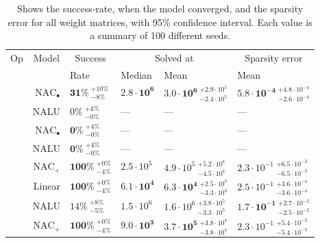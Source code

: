 \begin{table}[!h]

\caption{\label{tab:function-task-static-defaults}Shows the success-rate, when the model converged, and the sparsity error for all weight matrices, with 95\% confidence interval. Each value is a summary of 100 different seeds.}
\centering
\begin{tabular}{crllll}
\toprule
\multicolumn{1}{c}{Op} & \multicolumn{1}{c}{Model} & \multicolumn{1}{c}{Success} & \multicolumn{2}{c}{Solved at} & \multicolumn{1}{c}{Sparsity error} \\
\cmidrule(l{3pt}r{3pt}){1-1} \cmidrule(l{3pt}r{3pt}){2-2} \cmidrule(l{3pt}r{3pt}){3-3} \cmidrule(l{3pt}r{3pt}){4-5} \cmidrule(l{3pt}r{3pt}){6-6}
 &  & Rate & Median & Mean & Mean\\
\midrule
 & $\mathrm{NAC}_{\bullet}$ & $\mathbf{31\%} {~}^{+10\%}_{-8\%}$ & $\mathbf{2.8 \cdot 10^{6}}$ & $\mathbf{3.0 \cdot 10^{6}} {~}^{+2.9 \cdot 10^{5}}_{-2.4 \cdot 10^{5}}$ & $\mathbf{5.8 \cdot 10^{-4}} {~}^{+4.8 \cdot 10^{-4}}_{-2.6 \cdot 10^{-4}}$\\

\nopagebreak
\multirow{-2}{*}{\centering\arraybackslash $\bm{\times}$} & NALU & $0\% {~}^{+4\%}_{-0\%}$ & --- & --- & ---\\
\cmidrule{1-6}
 & $\mathrm{NAC}_{\bullet}$ & $\mathbf{0\%} {~}^{+4\%}_{-0\%}$ & --- & --- & ---\\

\nopagebreak
\multirow{-2}{*}{\centering\arraybackslash $\bm{\mathbin{/}}$} & NALU & $\mathbf{0\%} {~}^{+4\%}_{-0\%}$ & --- & --- & ---\\
\cmidrule{1-6}
 & $\mathrm{NAC}_{+}$ & $\mathbf{100\%} {~}^{+0\%}_{-4\%}$ & $2.5 \cdot 10^{5}$ & $4.9 \cdot 10^{5} {~}^{+5.2 \cdot 10^{4}}_{-4.5 \cdot 10^{4}}$ & $2.3 \cdot 10^{-1} {~}^{+6.5 \cdot 10^{-3}}_{-6.5 \cdot 10^{-3}}$\\

\nopagebreak
 & Linear & $\mathbf{100\%} {~}^{+0\%}_{-4\%}$ & $\mathbf{6.1 \cdot 10^{4}}$ & $\mathbf{6.3 \cdot 10^{4}} {~}^{+2.5 \cdot 10^{3}}_{-3.3 \cdot 10^{3}}$ & $2.5 \cdot 10^{-1} {~}^{+3.6 \cdot 10^{-4}}_{-3.6 \cdot 10^{-4}}$\\

\nopagebreak
\multirow{-3}{*}{\centering\arraybackslash $\bm{+}$} & NALU & $14\% {~}^{+8\%}_{-5\%}$ & $1.5 \cdot 10^{6}$ & $1.6 \cdot 10^{6} {~}^{+3.8 \cdot 10^{5}}_{-3.3 \cdot 10^{5}}$ & $\mathbf{1.7 \cdot 10^{-1}} {~}^{+2.7 \cdot 10^{-2}}_{-2.5 \cdot 10^{-2}}$\\
\cmidrule{1-6}
 & $\mathrm{NAC}_{+}$ & $\mathbf{100\%} {~}^{+0\%}_{-4\%}$ & $\mathbf{9.0 \cdot 10^{3}}$ & $\mathbf{3.7 \cdot 10^{5}} {~}^{+3.8 \cdot 10^{4}}_{-3.8 \cdot 10^{4}}$ & $2.3 \cdot 10^{-1} {~}^{+5.4 \cdot 10^{-3}}_{-5.4 \cdot 10^{-3}}$\\


\end{tabular}
\end{table}
